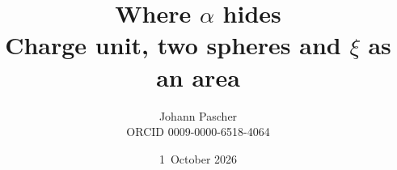 \documentclass[11pt,a4paper]{report}
\title{Where $\alpha$ hides\\[0.5em]
  \large Charge unit, two spheres and $\xi$ as an area}
\date{1~October 2026}
\author{Johann Pascher\\\small ORCID 0009-0000-6518-4064}
\begin{document}
\renewcommand{\thechapter}{}
\renewcommand{\thesection}{\arabic{section}}
\maketitle
\tableofcontents

\end{document}
